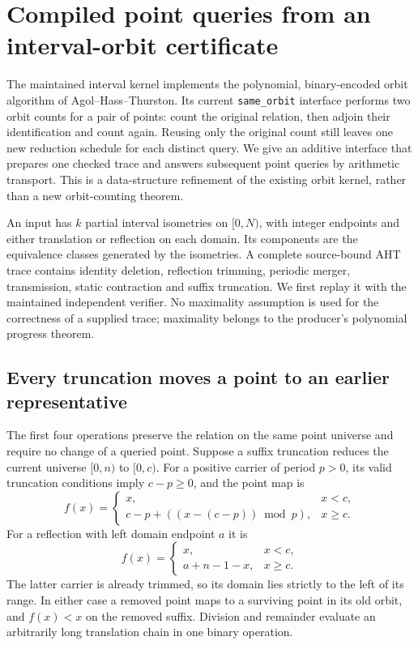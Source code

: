 \section{Compiled point queries from an interval-orbit certificate}
\label{sec:compiled-orbit-index}

The maintained interval kernel implements the polynomial, binary-encoded
orbit algorithm of Agol--Hass--Thurston.  Its current \texttt{same\_orbit}
interface performs two orbit counts for a pair of points: count the original
relation, then adjoin their identification and count again.  Reusing only the
original count still leaves one new reduction schedule for each distinct
query.  We give an additive interface that prepares one checked trace and
answers subsequent point queries by arithmetic transport.  This is a
data-structure refinement of the existing orbit kernel, rather than a new
orbit-counting theorem.

An input has $k$ partial interval isometries on $[0,N)$, with integer endpoints
and either translation or reflection on each domain.  Its components are the
equivalence classes generated by the isometries.  A complete source-bound AHT
trace contains identity deletion, reflection trimming, periodic merger,
transmission, static contraction and suffix truncation.  We first replay it
with the maintained independent verifier.  No maximality assumption is used
for the correctness of a supplied trace; maximality belongs to the producer's
polynomial progress theorem.

\subsection{Every truncation moves a point to an earlier representative}

The first four operations preserve the relation on the same point universe
and require no change of a queried point.  Suppose a suffix truncation reduces
the current universe $[0,n)$ to $[0,c)$.  For a positive carrier of period
$p>0$, its valid truncation conditions imply $c-p\ge0$, and the point map is
\[
 f(x)=\begin{cases}
 x,&x<c,\\
 c-p+((x-(c-p))\bmod p),&x\ge c.
 \end{cases}
\]
For a reflection with left domain endpoint $a$ it is
\[
 f(x)=\begin{cases}x,&x<c,\\a+n-1-x,&x\ge c.\end{cases}
\]
The latter carrier is already trimmed, so its domain lies strictly to the
left of its range.  In either case a removed point maps to a surviving point
in its old orbit, and $f(x)<x$ on the removed suffix.  Division and remainder
evaluate an arbitrarily long translation chain in one binary operation.

